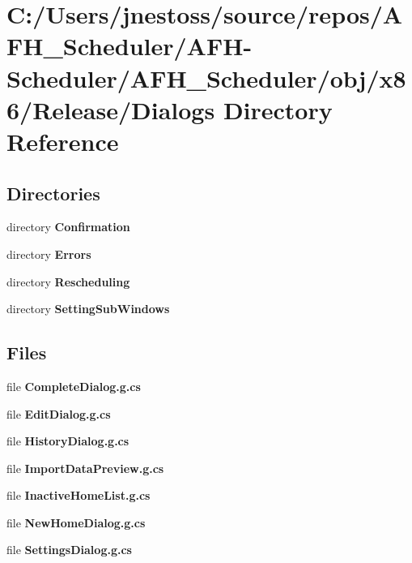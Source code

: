 \section{C\+:/\+Users/jnestoss/source/repos/\+A\+F\+H\+\_\+\+Scheduler/\+A\+F\+H-\/\+Scheduler/\+A\+F\+H\+\_\+\+Scheduler/obj/x86/\+Release/\+Dialogs Directory Reference}
\label{dir_a0c4b3fbace9b47a3c2600f07b8885b4}
\subsection*{Directories}
\begin{DoxyCompactItemize}
\item 
directory \textbf{ Confirmation}
\item 
directory \textbf{ Errors}
\item 
directory \textbf{ Rescheduling}
\item 
directory \textbf{ Setting\+Sub\+Windows}
\end{DoxyCompactItemize}
\subsection*{Files}
\begin{DoxyCompactItemize}
\item 
file \textbf{ Complete\+Dialog.\+g.\+cs}
\item 
file \textbf{ Edit\+Dialog.\+g.\+cs}
\item 
file \textbf{ History\+Dialog.\+g.\+cs}
\item 
file \textbf{ Import\+Data\+Preview.\+g.\+cs}
\item 
file \textbf{ Inactive\+Home\+List.\+g.\+cs}
\item 
file \textbf{ New\+Home\+Dialog.\+g.\+cs}
\item 
file \textbf{ Settings\+Dialog.\+g.\+cs}
\end{DoxyCompactItemize}
